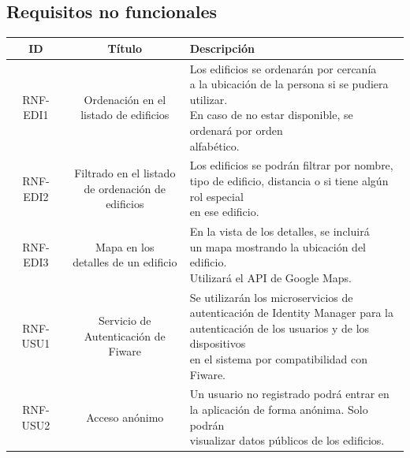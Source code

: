 \documentclass[12pt, a4paper, twoside]{article}
\begin{document}
{\footnotesize
 \subsection{Requisitos no funcionales}
 \begin{longtable}{ |c|c|l| }
  \hline
  ID       & Título & Descripción \\ \hline
  RNF-EDI1 & \makecell{Ordenación en el \\ listado de edificios}
  & \makecell[l]{Los edificios se ordenarán por cercanía \\
  a la ubicación de la persona si se pudiera utilizar. \\
  En caso de no estar disponible, se ordenará por orden \\
  alfabético. 
  }\\ \hline

  RNF-EDI2 & \makecell{
    Filtrado en el listado \\
    de ordenación de edificios}
  & \makecell[l]{Los edificios se podrán filtrar por nombre, \\
  tipo de edificio, distancia o si tiene algún rol especial \\
  en ese edificio.
  } \\ \hline

  RNF-EDI3 & \makecell{Mapa en los \\ detalles de un edificio}
  & \makecell[l]{En la vista de los detalles, se incluirá  \\
  un mapa mostrando la ubicación del edificio.\\
  Utilizará el API de Google Maps.
   } \\ \hline

  RNF-USU1 & \makecell{Servicio de \\Autenticación de Fiware}
  & \makecell[l]{Se utilizarán los microservicios de \\
  autenticación de Identity Manager para la \\
  autenticación de los usuarios y de los dispositivos \\
  en el sistema por compatibilidad con Fiware.
  } \\ \hline
  
  RNF-USU2 & Acceso anónimo 
  & \makecell[l]{Un usuario no registrado podrá entrar en \\
   la aplicación de forma anónima. Solo podrán\\
   visualizar datos públicos de los edificios.
   } \\ \hline
  

\end{longtable}}
\end{document}
